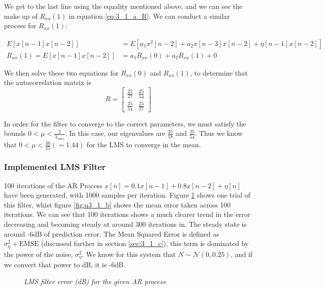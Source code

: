 \documentclass[./main.tex]{subfiles}
\begin{document}
We get to the last line using the equality mentioned above, and we can see the make up of $R_{xx}(1)$ in equation \ref{eq:3_1_a_R}. We can conduct a similar process for $R_{xx}(1)$:

\begin{subequations}
\begin{align}
E[x[n-1]x[n-2]] &= E[ a_1 x^2[n - 2] + a_2 x[n-3]x[n-2] + \eta[n-1]x[n-2] ] \\
R_{xx}(1) = E[x[n-1]x[n-2]] &= a_1 R_{xx}(0) + a_2 R_{xx}(1) + 0
\end{align}
\end{subequations}

We then solve these two equations for $ R_{xx}(0) $ and $ R_{xx}(1) $, to determine that the autocorrelation matrix is 
$$ R = \begin{bmatrix}
\frac{25}{27} & \frac{25}{54} \\[0.3em]
 \frac{25}{54} & \frac{25}{27}
\end{bmatrix}
$$

In order for the filter to converge to the correct parameters, we must satisfy the bounds $ 0 < \mu < \frac{2}{\lambda_{max}} $. In this case, our eigenvalues are $\frac{25}{18}$ and $\frac{25}{54}$. Thus we know that $ 0 < \mu < \frac{36}{25} ( = 1.44) $ for the LMS to converge in the mean.

\subsubsection{Implemented LMS Filter} \label{sec:3_1_b}
100 iterations of the AR Process $ x[n] = 0.1 x[n-1] + 0.8 x[n-2] + \eta[n] $ have been generated, with 1000 samples per iteration. Figure \ref{fig:q3_1_b_indiv} shows one trial of this filter, whist figure \ref{fig:q3_1_b} shows the mean error taken across 100 iterations. We can see that 100 iterations shows a much clearer trend in the error decreasing and becoming steady at around 300 iterations in. The steady state is around -6dB of prediction error. The Mean Squared Error is defined as $ \sigma^2_\eta + \mathrm{EMSE} $ (discussed further in section \ref{sec:3_1_c}), this term is dominated by the power of the noise, $\sigma^2_\eta  $. We know for this system that $ N \sim \mathcal{N}(0,0.25) $, and if we convert that power to dB, it is -6dB.

\begin{figure}[h]
	\centering 
 	\resizebox{\textwidth}{!}{}
   	\caption{\textit{LMS filter error (dB) for the given AR process}}
   	\label{fig:q3_1_b_indiv}
\end{figure}
\end{document}
